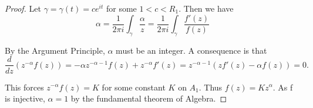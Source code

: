 \documentclass[12pt]{article} %
\begin{document}
\begin{proof}
  Let $\gamma = \gamma(t)= ce^{it}$ for some $1<c<R_1$. Then we have
  \[\alpha = \dfrac{1}{2\pi i}\int_{\gamma}\dfrac{\alpha}{z} =\dfrac{1}{2\pi i}\int_{\gamma}\dfrac{f'(z)}{f(z)} \]

  By the Argument Principle, $\alpha$ must be an integer. A consequence is that
  \[\dfrac{d}{dz}(z^{-\alpha}f(z))= -\alpha z^{-\alpha-1}f(z)+z^{-\alpha}f'(z) = z^{-\alpha-1}(zf'(z)-\alpha f(z))=0.\]

  This forces $z^{-\alpha}f(z)=K$ for some constant $K$ on $A_1$. Thus $f(z)=Kz^{\alpha}$. As f is injective, $\alpha=1$ by the fundamental theorem of Algebra.
\end{proof}
\end{document}
